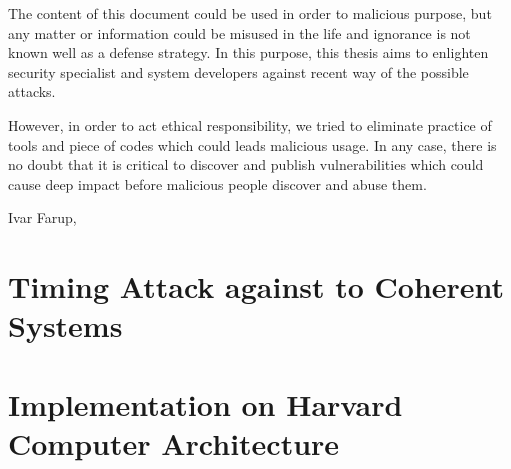 \documentclass[medieteknikk]{gucmasterthesis}
\begin{document}
The content of this document could be used in order to malicious purpose, but any matter or information could be misused in the life and ignorance is not known well as a defense strategy. In this purpose, this thesis aims to enlighten security specialist and system developers against recent way of the possible attacks. 

However, in order to act ethical responsibility, we tried to eliminate practice of tools and piece of codes which could leads malicious usage. In any case, there is no doubt that it is critical to discover and publish vulnerabilities which could cause deep impact before malicious people discover and abuse them.



\vspace{\baselineskip}
\noindent Ivar Farup, \gucmasterthesisdate

\tableofcontents
\listoffigures
\listoftables





\chapter{Timing Attack against to Coherent Systems}
\chapter{Implementation on Harvard Computer Architecture}
\end{document}
